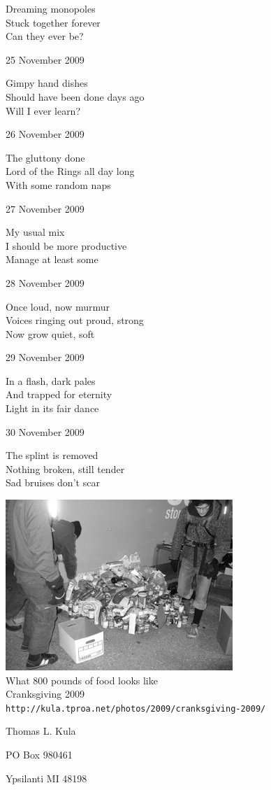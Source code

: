 \documentclass[12pt]{article}
\begin{document}
Dreaming monopoles \\
Stuck together forever \\
Can they ever be?

25 November 2009

Gimpy hand dishes \\
Should have been done days ago \\
Will I ever learn?

26 November 2009

The gluttony done \\
Lord of the Rings all day long \\
With some random naps

27 November 2009

My usual mix \\
I should be more productive \\
Manage at least some

28 November 2009

Once loud, now murmur \\
Voices ringing out proud, strong \\
Now grow quiet, soft

29 November 2009

In a flash, dark pales \\
And trapped for eternity \\
Light in its fair dance

30 November 2009

The splint is removed \\
Nothing broken, still tender \\
Sad bruises don't scar


\newpage

\begin{center}
\includegraphics{cranksgiving.jpg} \\[1cm]
What 800 pounds of food looks like \\
Cranksgiving 2009 \\
{\tt http://kula.tproa.net/photos/2009/cranksgiving-2009/ }
\end{center}

\newpage

\thispagestyle{empty}
\vspace*{14cm}
\begin{sideways}
\Large{Thomas L. Kula}
\end{sideways}
\begin{sideways}
\Large{PO Box 980461}
\end{sideways}
\begin{sideways}
\Large{Ypsilanti MI 48198}
\end{sideways}
\end{document}
